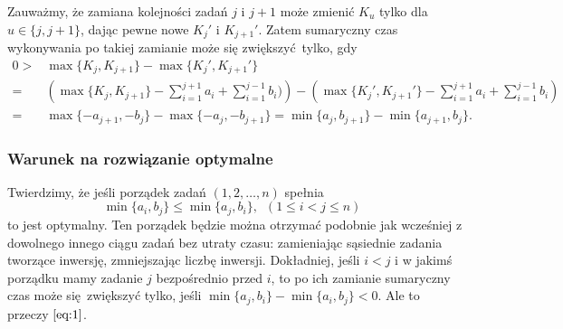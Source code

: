 \documentclass[a4paper, 12pt]{article}
\newcommand{\+}{\enspace}
\begin{document}
Zauważmy, że zamiana kolejności zadań $j$ i $j+1$
może zmienić $K_u$ tylko dla $u ∈ \{j, j+1\}$,
dając pewne nowe $K_j'$ i $K_{j+1}'$.
Zatem sumaryczny czas wykonywania po takiej zamianie może się zwiększyć tylko, gdy
\begin{align*}
0 >& \max \{ K_j, K_{j+1} \} - \max \{ K_j', K_{j+1}' \} \\
	=& \left(\max \{ K_j, K_{j+1} \} - ∑_{i=1}^{j+1} a_i + ∑_{i=1}^{j-1} b_i) \right)
	- \left(\max \{ K_j', K_{j+1}' \} - ∑_{i=1}^{j+1} a_i + ∑_{i=1}^{j-1} b_i \right) \\
=& \max \{ -a_{j+1}, -b_j \} - \max \{ -a_j, -b_{j+1} \}
= \min \{ a_j, b_{j+1} \} - \min \{ a_{j+1}, b_j \}.
\end{align*}

\subsubsection*{Warunek na rozwiązanie optymalne}
Twierdzimy, że jeśli
porządek zadań $(1, 2, …, n)$
spełnia
\begin{equation}
	\label{eq:1}
	\min \{ a_i, b_j \} ≤ \min \{ a_j, b_i \},
	\+
	(1 ≤ i < j ≤ n) \+
\end{equation}
to jest optymalny.
Ten porządek będzie można otrzymać podobnie jak wcześniej z dowolnego innego
ciągu zadań bez utraty czasu:
zamieniając sąsiednie zadania tworzące inwersję,
zmniejszając liczbę inwersji.
Dokładniej,
jeśli $i<j$ i w jakimś porządku mamy zadanie $j$ bezpośrednio przed $i$,
to po ich zamianie sumaryczny czas może się zwiększyć tylko,
jeśli $\min \{ a_j, b_i \} - \min \{ a_i, b_j \} < 0$.
Ale to przeczy $\eqref{eq:1}$.

\iffalse
Pokażemy, że ta relacja jest przechodnia.
Załóżmy, że
$\min \{ a_1, b_2 \} ≤ \min \{ a_2, b_1 \}$ i
$\min \{ a_1, b_2 \} ≤ \min \{ a_2, b_1 \}$.
\begin{enumerate}
	\item Jeśli $a_1 ≤ b_2, a_2, b_1$ i $a_2 ≤ b_3, a_3, b_2$, \\
		to $a_1 ≤ a_2 ≤ a_3$ i $a_1 ≤ b_1$, więc $a_1 ≤ \min \{a_3, b_1\}$.
	\item Jeśli $b_2 ≤ a_1, a_2, b_1$ i $b_3 ≤ a_2, a_3, b_2$, \\
		to $b_3 ≤ b_2 ≤ b_1$ i $b_3 ≤ a_3$, więc $b_3 ≤ \min \{a_3, b_1\}$.
	\item Jeśli $a_1 ≤ b_2, a_2, b_1$ i $b_3 ≤ a_2, a_3, b_2$, \\
		to $a_1 ≤ b_1$ i $b_3 ≤ a_3$,
		więc $\min \{a_1, b_3\} ≤ \min \{a_3, b_1 \}$.
	\item Jeśli $b_2 ≤ a_1, a_2, b_1$ i $a_2 ≤ b_3, a_3, b_2$, to
		$a_2 = b_2$.
		Zadania $1$ i $2$ oraz $2$ i $3$ są równoważne w rozpatrywanym porządku,
		ale wystarczy, aby $1$ było przed $3$ w porządku optymalnym, aby
		można było do niego sprowadzić każdy inny porządek.
\end{enumerate}
\fi
\end{document}
